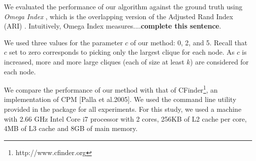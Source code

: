 %
%
%
%
%
%

We evaluated the performance of our algorithm against the ground truth 
using {\it Omega Index} \cite{doi:10.1207/s15327906mbr2302_6}, 
which is the overlapping version of the Adjusted Rand Index (ARI) \cite{ARI_paper_1985}.
Intuitively, Omega Index measures....{\bf complete this sentence}.

We used three values for the parameter $c$ of our method: 0, 2, and 5. 
Recall that $c$ set to zero corresponds to picking only the largest clique for each node. 
As $c$ is increased, more and more large cliques (each of size at least $k$)
are considered for each node. 

We compare the performance of our method with that of CFinder\footnote{http://www.cfinder.org}, an implementation of CPM [Palla et al.2005]. We used the command line utility provided in the package for all experiments. For this study, we used a machine with 2.66 GHz Intel Core i7 processor with 2 cores, 256KB of L2 cache per core, 4MB of L3 cache and 8GB of main memory.

